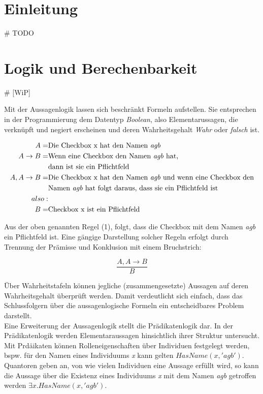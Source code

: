 \documentclass[runningheads,a4paper]{llncs}
\begin{document}
\section{Einleitung}
\# TODO
\newpage
\section{Logik und Berechenbarkeit}

\# [WiP]

Mit der Aussagenlogik lassen sich beschränkt Formeln aufstellen. Sie entsprechen in der Programmierung dem Datentyp \textit{Boolean}, also Elementarussagen, die verknüpft und negiert erscheinen und deren Wahrheitsgehalt \textit{Wahr} oder \textit{falsch} ist.

\begin{align}
\begin{split}
A = & \textnormal{Die Checkbox x hat den Namen \textit{agb}}\\
A \to B = & \textnormal{Wenn eine Checkbox den Namen \textit{agb} hat,} \\
& \textnormal{dann ist sie ein Pflichtfeld}\\
A, A \to B = & \textnormal{Die Checkbox x hat den Namen \textit{agb} und wenn eine Checkbox den} \\
& \textnormal{Namen \textit{agb} hat folgt daraus, dass sie ein Pflichtfeld ist}\\
also:\\
B =& \textnormal{Checkbox x ist ein Pflichtfeld}
\end{split}
\end{align}

Aus der oben genannten Regel (1), folgt, dass die Checkbox mit dem Namen \textit{agb} ein Pflichtfeld ist.
Eine gängige Darstellung solcher Regeln erfolgt durch Trennung der Prämisse und Konklusion mit einem Bruchstrich:

\begin{equation}
\frac{A, A \to B}{B}
\end{equation}

Über Wahrheitstafeln können jegliche (zusammengesetzte) Aussagen auf deren Wahrheitsgehalt überprüft werden. 
Damit verdeutlicht sich einfach, dass das Schlussfolgern über die aussagenlogische Formeln ein entscheidbares Problem darstellt.
\\

Eine Erweiterung der Aussagenlogik stellt die Prädikatenlogik dar.
In der Prädikatenlogik werden Elementaraussagen hinsichtlich ihrer Struktur untersucht.
Mit Prdäikaten können Rolleneigenschaften über Individuen festgelegt werden, bspw. für den Namen eines Individuums \textit{x} kann gelten $HasName(x, 'agb')$.  
Quantoren geben an, von wie vielen Individuen eine Aussage erfüllt wird, so kann die Aussage über die Existenz eines Individuums \textit{x} mit dem Namen \textit{agb} getroffen werden $\exists x. HasName(x, 'agb')$.
\end{document}
